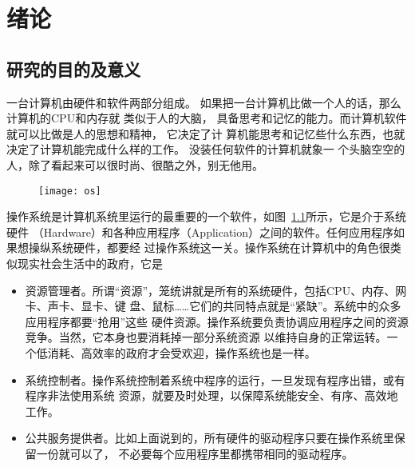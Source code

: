 \documentclass{swfcthesismscctex}
\begin{document}
%

%
\Chairman{}

\frontmatter          
\makepreliminarypages%
\tableofcontents     %
\listoffigures       %
\listoflistings
\listoffixmes{}

\mainmatter{}

\chapter{绪论}

\section{研究的目的及意义}

一台计算机由硬件和软件两部分组成。 如果把一台计算机比做一个人的话，那么计算机的CPU和内存就
类似于人的大脑， 具备思考和记忆的能力。而计算机软件就可以比做是人的思想和精神， 它决定了计
算机能思考和记忆些什么东西，也就决定了计算机能完成什么样的工作。 没装任何软件的计算机就象一
个头脑空空的人，除了看起来可以很时尚、很酷之外，别无他用。

\begin{figure}
  \centering
  \texttt{[image: os]}
  \label{fig:os}
\end{figure}

操作系统是计算机系统里运行的最重要的一个软件，如图~\ref{fig:os}所示，它是介于系统硬件
（Hardware）和各种应用程序（Application）之间的软件。任何应用程序如果想操纵系统硬件，都要经
过操作系统这一关。操作系统在计算机中的角色很类似现实社会生活中的政府，它是
\begin{itemize}
\item 资源管理者。所谓“资源”，笼统讲就是所有的系统硬件，包括CPU、内存、网卡、声卡、显卡、键
  盘、鼠标\ldots{}\ldots{}它们的共同特点就是``紧缺''。系统中的众多应用程序都要``抢用''这些
  硬件资源。操作系统要负责协调应用程序之间的资源竞争。当然，它本身也要消耗掉一部分系统资源
  以维持自身的正常运转。一个低消耗、高效率的政府才会受欢迎，操作系统也是一样。
\item 系统控制者。操作系统控制着系统中程序的运行，一旦发现有程序出错，或有程序非法使用系统
  资源，就要及时处理，以保障系统能安全、有序、高效地工作。
\item 公共服务提供者。比如上面说到的，所有硬件的驱动程序只要在操作系统里保留一份就可以了，
  不必要每个应用程序里都携带相同的驱动程序。
\end{itemize}
\end{document}
